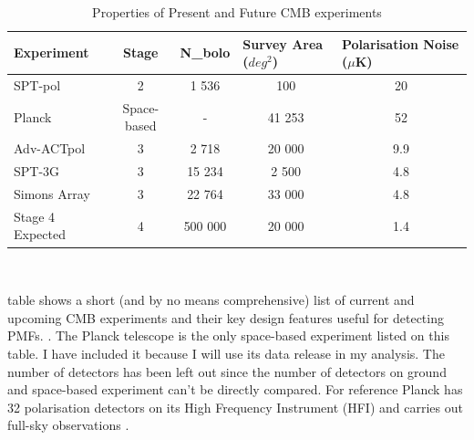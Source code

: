 \begin{table}[b]
\centering
\caption{Properties of Present and Future CMB experiments}
\label{table:future cmb}
\begin{tabular}{l|l|l|l|l}
Experiment & \multicolumn{1}{c|}{Stage} & \multicolumn{1}{c|}{N_{bolo}} & Survey Area ($deg^{2}$)& Polarisation Noise ($\mu$K) \\ \hline
SPT-pol & \multicolumn{1}{c|}{2} & \multicolumn{1}{c|}{1 536} & \multicolumn{1}{c|}{100} & \multicolumn{1}{c}{20} \\
Planck & \multicolumn{1}{c|}{Space-based} & \multicolumn{1}{c|}{-} & \multicolumn{1}{c|}{41 253} & \multicolumn{1}{c}{52} \\
Adv-ACTpol & \multicolumn{1}{c|}{3} & \multicolumn{1}{c|}{2 718} & \multicolumn{1}{c|}{20 000} & \multicolumn{1}{c}{9.9} \\
SPT-3G & \multicolumn{1}{c|}{3} & \multicolumn{1}{c|}{15 234} & \multicolumn{1}{c|}{2 500} & \multicolumn{1}{c}{4.8} \\
Simons Array & \multicolumn{1}{c|}{3} & \multicolumn{1}{c|}{22 764} & \multicolumn{1}{c|}{33 000} & \multicolumn{1}{c}{4.8} \\ 
Stage 4 Expected & \multicolumn{1}{c|}{4} & \multicolumn{1}{c|}{500 000} & \multicolumn{1}{c|}{20 000} & \multicolumn{1}{c}{1.4} \\
\end{tabular}
\\
\begin{flushleft}
table shows a short (and by no means comprehensive) list of current and upcoming CMB experiments and their key design features useful for detecting PMFs. \cite{Henderson:2015nzj} \cite{Benson:2014qhw} \cite{Suzuki:2015zzg} \cite{Adam:2015vua}. The Planck telescope is the only space-based experiment listed on this table. I have included it because I will use its data release in my analysis. The number of detectors has been left out since the number of detectors on ground and space-based experiment can't be directly compared. For reference Planck has 32 polarisation detectors on its High Frequency Instrument (HFI) and carries out full-sky observations \cite{Lamarre:2003zh}.
\end{flushleft} 
\end{table}

